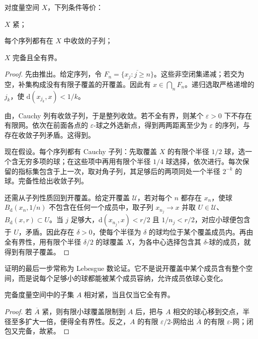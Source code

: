\begin{theorem}[度量空间的紧性判据]\label{b1:thm:app-metric-compact}
对度量空间 \(X\)，下列条件等价：
\begin{equivalences}
\item\label{b1:item:app-compact-cover}\(X\) 紧；
\item\label{b1:item:app-compact-sequence}每个序列都有在 \(X\) 中收敛的子列；
\item\label{b1:item:app-compact-complete} \(X\) 完备且全有界。
\end{equivalences}
\end{theorem}
\begin{proof}
先由推出。给定序列，令 \(F_n=\overline{\{x_j:j\ge n\}}\)。这些非空闭集递减；若交为空，补集构成没有有限子覆盖的开覆盖。因此有 \(x\in\bigcap_nF_n\)。递归选取严格递增的 \(j_k\)，使 \(\mathrm{d}(x_{j_k},x)<1/k\)。

由，Cauchy 列有收敛子列，于是整列收敛。若不全有界，则某个 \(\varepsilon>0\) 下不存在有限网。依次在前面各点的 \(\varepsilon\)-球之外选新点，得到两两距离至少为 \(\varepsilon\) 的序列，与存在收敛子列矛盾。这得到。

现在假设。每个序列都有 Cauchy 子列：先取覆盖 \(X\) 的有限个半径 \(1/2\) 球，选一个含无穷多项的球；在这些项中再用有限个半径 \(1/4\) 球选择，依次进行。每次保留的指标集包含于上一次，取对角子列，其足够后的两项同处一个半径 \(2^{-k}\) 的球。完备性给出收敛子列。

还需从子列性质回到开覆盖。给定开覆盖 \(\mathcal U\)，若对每个 \(n\) 都存在 \(x_n\)，使球 \(B_{\mathrm{d}}(x_n,1/n)\) 不包含在任何一个成员中，取子列 \(x_{n_j}\rightarrow x\) 并取 \(U\in\mathcal U\)、\(B_{\mathrm{d}}(x,r)\subset U\)。当 \(j\) 足够大，\(\mathrm{d}(x_{n_j},x)<r/2\) 且 \(1/n_j<r/2\)，对应小球便包含于 \(U\)，矛盾。因此存在 \(\delta>0\)，使每个半径为 \(\delta\) 的球均位于某个覆盖成员内。再由全有界性，用有限个半径 \(\delta/2\) 的球覆盖 \(X\)，为各中心选择包含其 \(\delta\)-球的成员，就得到有限子覆盖。
\end{proof}

证明的最后一步常称为 Lebesgue 数论证。它不是说开覆盖中某个成员含有整个空间，而是说每个足够小的球都能被某个成员容纳，允许成员依球心变化。

\begin{corollary}\label{b1:cor:app-relative-compact}
完备度量空间中的子集 \(A\) 相对紧，当且仅当它全有界。
\end{corollary}
\begin{proof}
若 \(\overline A\) 紧，则有限小球覆盖限制到 \(A\) 后，把与 \(A\) 相交的球心移到交点，半径至多扩大一倍，便得全有界性。反之，\(A\) 的有限 \(\varepsilon/2\)-网给出 \(\overline A\) 的有限 \(\varepsilon\)-网；闭包又完备，故紧。
\end{proof}


